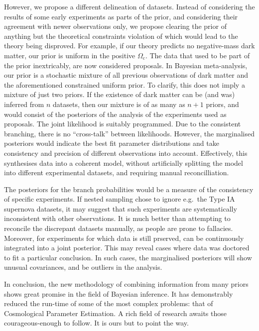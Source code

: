 \documentclass[usenatbib]{mnras}
\begin{document}
However, we propose a different delineation of datasets. Instead of
considering the results of some early experiments as parts of the
prior, and considering their agreement with newer observations only,
we propose clearing the prior of anything but the theoretical
constraints violation of which would lead to the theory being
disproved. For example, if our theory predicts no negative-mass dark
matter, our prior is uniform in the positive
\(\Omega_{\mathrm{c}}\). The data that used to be part of the prior
inextricably, are now considered proposals. In Bayesian meta-analysis,
our prior is a stochastic mixture of all previous observations of dark
matter and the aforementioned constrained uniform prior. To clarify,
this does not imply a mixture of just two priors. If the existence of
dark matter can be (and was) inferred from \(n\) datasets, then our
mixture is of as many as \(n+1\) priors, and would consist of the
posteriors of the analysis of the experiments used as proposals. The
joint likelihood is suitably programmed. Due to the consistent
branching, there is no ``cross-talk'' between likelihoods. However,
the marginalised posteriors would indicate the best fit parameter
distributions and take consistency and precision of different
observations into account. Effectively, this synthesises data into a
coherent model, without artificially splitting the model into
different experimental datasets, and requiring manual reconcilliation.

The posteriors for the branch probabilities would be a measure of the
consistency of specific experiments. If nested sampling chose to
ignore e.g.~the Type IA supernova datasets, it may suggest that such
experiments are systematically inconsistent with other
observations. It is much better than attempting to reconcile the
discrepant datasets manually, as people are prone to
fallacies. Moreover, for experiments for which data is still prserved,
can be continuously integrated into a joint posterior. This may reveal
cases where data was doctored to fit a particular conclusion. In such
cases, the marginalised posteriors will show unusual covariances, and
be outliers in the analysis. 


In conclusion, the new methodology of combining information from many
priors shows great promise in the field of Bayesian inference. It has
demonstrably reduced the run-time of some of the most complex
problems: that of Cosmological Parameter Estimation. A rich field of
research awaits those courageous-enough to follow. It is ours but to point
the way.
\end{document}
